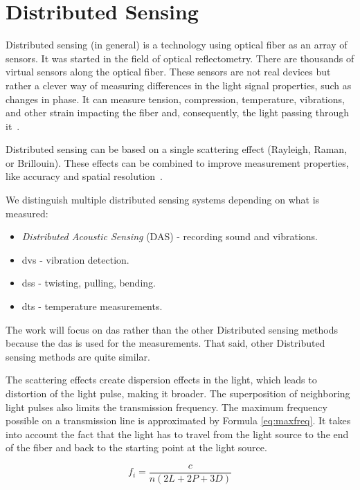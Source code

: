 \chapter{Distributed Sensing}\label{txt.distributed}

Distributed sensing (in general) is a technology using optical fiber as an array of sensors. It was started in the field of optical reflectometry. There are thousands of virtual sensors along the optical fiber. These sensors are not real devices but rather a clever way of measuring differences in the light signal properties, such as changes in phase. It can measure tension, compression, temperature, vibrations, and other strain impacting the fiber and, consequently, the light passing through it~\cite{dasKislov}. %

Distributed sensing can be based on a single scattering effect (Rayleigh, Raman, or Brillouin). These effects can be combined to improve measurement properties, like accuracy and spatial resolution~\cite{raybril}.

We distinguish multiple distributed sensing systems depending on what is measured:
\begin{itemize}
    \item \emph{Distributed Acoustic Sensing} (DAS) - recording sound and vibrations.
    \item \ac{dvs} - vibration detection.
    \item \ac{dss} - twisting, pulling, bending.
    \item \ac{dts} - temperature measurements.
\end{itemize}

The work will focus on \ac{das} rather than the other Distributed sensing methods because the \ac{das} is used for the measurements. That said, other Distributed sensing methods are quite similar. 

The scattering effects create dispersion effects in the light, which leads to distortion of the light pulse, making it broader. The superposition of neighboring light pulses also limits the transmission frequency. The maximum frequency possible on a transmission line is approximated by Formula \ref{eq:maxfreq}. It takes into account the fact that the light has to travel from the light source to the end of the fiber and back to the starting point at the light source. 

\begin{equation}\label{eq:maxfreq}
    f_i = \frac{c}{n(2L+2P+3D)}
\end{equation}
\bigskip


